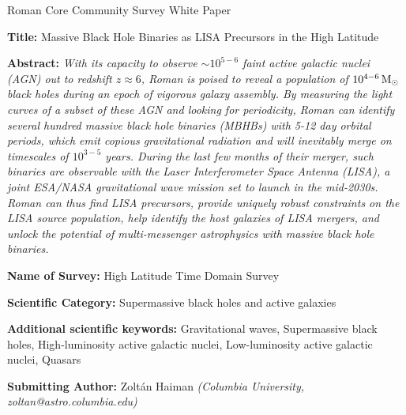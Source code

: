 \documentclass[tightenlines,superscriptaddress,amsmath,amssymb,prl,12pt]{revtex4-1}
\newcommand{\msun}{{\rm M}_\odot}
\begin{document}
\pagestyle{plain}
\setcounter{page}{1}

\noindent
\begin{center}
{\large Roman Core Community Survey White Paper}
\end{center}

{\large {\bf Title:} Massive Black Hole Binaries as LISA Precursors in the High Latitude}

\vspace{0.1\baselineskip}

\hspace{0.52in}{\large Time Domain Survey}

\vspace{0.5\baselineskip}

{\bf Abstract:} {\it With its capacity to observe $\sim 10^{5-6}$ faint active galactic nuclei (AGN) out to redshift $z\approx 6$, Roman is poised to reveal a population of  $10^{4-6}\, \msun$ black holes during an epoch of vigorous galaxy assembly. By measuring the light curves of a subset of these AGN and looking for periodicity, Roman can identify several hundred massive black hole binaries (MBHBs) with 5-12 day orbital periods, which emit copious gravitational radiation and will inevitably merge on timescales of $10^{3-5}$ years. During the last few months of their merger, such binaries are observable with the Laser Interferometer Space Antenna (LISA), a joint ESA/NASA gravitational wave mission set to launch in the mid-2030s.  Roman can thus find LISA precursors, provide uniquely robust constraints on the LISA source population, help identify the host galaxies of LISA mergers, and unlock the potential of multi-messenger astrophysics with massive black hole binaries.}

\vspace{0.5\baselineskip}

{\bf Name of Survey:} High Latitude Time Domain Survey

{\bf Scientific Category:}  Supermassive black holes and active galaxies 

{\bf Additional scientific keywords:} Gravitational waves, Supermassive black holes, High-luminosity active galactic nuclei, Low-luminosity active galactic nuclei, Quasars

\vspace{0.5\baselineskip}

{\bf Submitting Author:}  Zolt\'an Haiman {\it (Columbia University, zoltan@astro.columbia.edu)}\\
%
\end{document}
